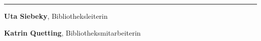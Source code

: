 \begin{center}\rule{0.5\linewidth}{\linethickness}\end{center}

\textbf{Uta Siebeky}, Bibliotheksleiterin

\textbf{Katrin Quetting}, Bibliotheksmitarbeiterin
